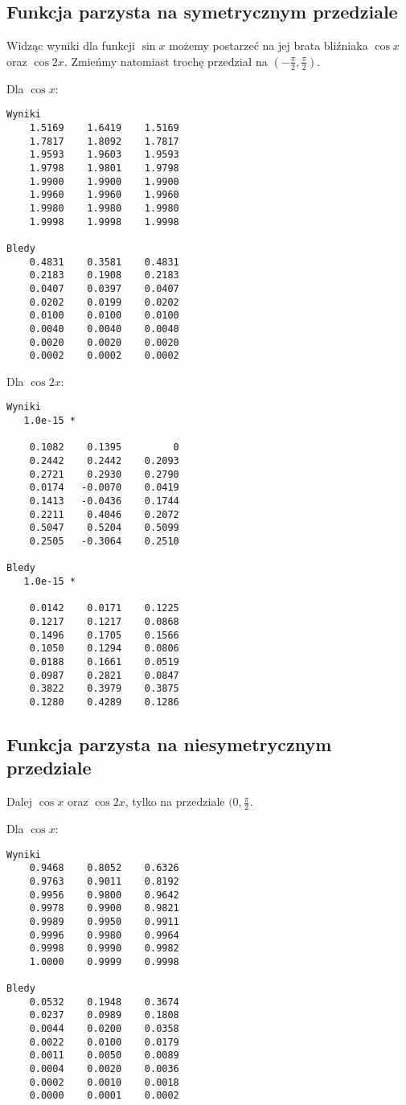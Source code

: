 \documentclass[12pt]{article}
\begin{document}
\subsection{Funkcja parzysta na symetrycznym przedziale}

Widząc wyniki dla funkcji $\sin{x}$ możemy postarzeć na jej brata bliźniaka $\cos{x}$ oraz $\cos{2x}$.
Zmieńmy natomiast trochę przedział na $(-\frac{\pi}{2}, \frac{\pi}{2})$.

Dla $\cos{x}$:
\begin{lstlisting}
Wyniki
    1.5169    1.6419    1.5169
    1.7817    1.8092    1.7817
    1.9593    1.9603    1.9593
    1.9798    1.9801    1.9798
    1.9900    1.9900    1.9900
    1.9960    1.9960    1.9960
    1.9980    1.9980    1.9980
    1.9998    1.9998    1.9998

Bledy
    0.4831    0.3581    0.4831
    0.2183    0.1908    0.2183
    0.0407    0.0397    0.0407
    0.0202    0.0199    0.0202
    0.0100    0.0100    0.0100
    0.0040    0.0040    0.0040
    0.0020    0.0020    0.0020
    0.0002    0.0002    0.0002
\end{lstlisting}

Dla $\cos{2x}$:
\begin{lstlisting}
Wyniki
   1.0e-15 *

    0.1082    0.1395         0
    0.2442    0.2442    0.2093
    0.2721    0.2930    0.2790
    0.0174   -0.0070    0.0419
    0.1413   -0.0436    0.1744
    0.2211    0.4046    0.2072
    0.5047    0.5204    0.5099
    0.2505   -0.3064    0.2510

Bledy
   1.0e-15 *

    0.0142    0.0171    0.1225
    0.1217    0.1217    0.0868
    0.1496    0.1705    0.1566
    0.1050    0.1294    0.0806
    0.0188    0.1661    0.0519
    0.0987    0.2821    0.0847
    0.3822    0.3979    0.3875
    0.1280    0.4289    0.1286
\end{lstlisting}

\subsection{Funkcja parzysta na niesymetrycznym przedziale}

Dalej $\cos{x}$ oraz $\cos{2x}$, tylko na przedziale $(0, \frac{\pi}{2}$.

Dla $\cos{x}$:
\begin{lstlisting}
Wyniki
    0.9468    0.8052    0.6326
    0.9763    0.9011    0.8192
    0.9956    0.9800    0.9642
    0.9978    0.9900    0.9821
    0.9989    0.9950    0.9911
    0.9996    0.9980    0.9964
    0.9998    0.9990    0.9982
    1.0000    0.9999    0.9998

Bledy
    0.0532    0.1948    0.3674
    0.0237    0.0989    0.1808
    0.0044    0.0200    0.0358
    0.0022    0.0100    0.0179
    0.0011    0.0050    0.0089
    0.0004    0.0020    0.0036
    0.0002    0.0010    0.0018
    0.0000    0.0001    0.0002
\end{lstlisting}
\end{document}
